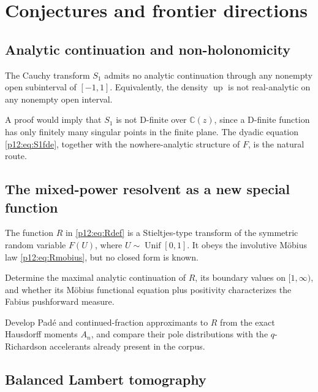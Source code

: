 \documentclass[11pt,oneside]{article}
\theoremstyle{definition}
\theoremstyle{remark}
\newcommand{\F}{F}
\newcommand{\Up}{\operatorname{up}}
\newcommand{\C}{\mathbb C}
\newcommand{\1}{\mathbf 1}
\begin{document}
\section{Conjectures and frontier directions}

\subsection{Analytic continuation and non-holonomicity}

\begin{conjecture}
The Cauchy transform \(S_1\) admits no analytic continuation through any
nonempty open subinterval of \([-1,1]\).  Equivalently, the density \(\Up\) is
not real-analytic on any nonempty open interval.
\end{conjecture}

A proof would imply that \(S_1\) is not D-finite over \(\C(z)\), since a
D-finite function has only finitely many singular points in the finite plane.
The dyadic equation \eqref{p12:eq:S1fde}, together with the nowhere-analytic
structure of \(\F\), is the natural route.

\subsection{The mixed-power resolvent as a new special function}

The function \(R\) in \eqref{p12:eq:Rdef} is a Stieltjes-type transform of the
symmetric random variable \(\F(U)\), where \(U\sim\operatorname{Unif}[0,1]\).
It obeys the involutive Möbius law \eqref{p12:eq:Rmobius}, but no closed form is
known.

\begin{problem}
Determine the maximal analytic continuation of \(R\), its boundary values on
\([1,\infty)\), and whether its Möbius functional equation plus positivity
characterizes the Fabius pushforward measure.
\end{problem}

\begin{problem}
Develop Pad\'e and continued-fraction approximants to \(R\) from the exact
Hausdorff moments \(A_n\), and compare their pole distributions with the
\(q\)-Richardson accelerants already present in the corpus.
\end{problem}

\subsection{Balanced Lambert tomography}
\end{document}
